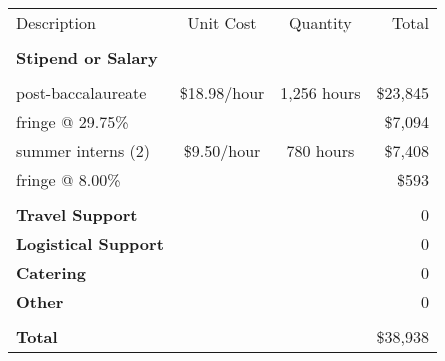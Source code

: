 \begin{center}
\begin{tabular}{lccr}
Description & Unit Cost & Quantity & Total \\
\\
{\bf Stipend or Salary}\\
\vspace{-0.5em}\\
post-baccalaureate  & \$18.98/hour & 1,256 hours & \$23,845 \\
fringe  @ 29.75\% & & & \$7,094 \\
summer interns (2) &  \$9.50/hour  & 780 hours & \$7,408 \\
fringe  @ 8.00\% & & & \$593 \\
\vspace{-0.5em}\\
{\bf Travel Support}&  & & 0 \\
{\bf Logistical Support} &  & & 0 \\
{\bf Catering} &  & & 0 \\
{\bf Other} &  & & 0 \\
\vspace{-0.5em}\\
{\bf Total} & & & \$38,938\\
\end{tabular}
\end{center}
